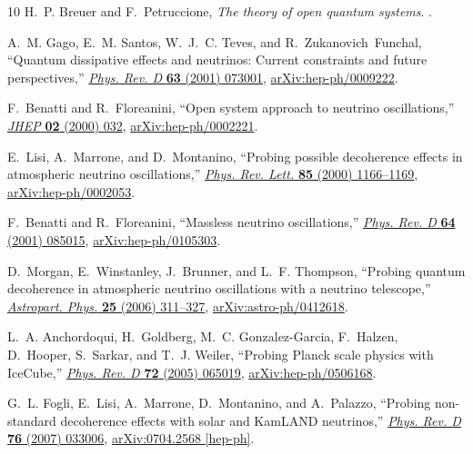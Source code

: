 \documentclass[aps, prd, onecolumn, tightenlines, notitlepage, superscriptaddress, nofootinbib, preprintnumbers, floatfix,showkeys,11pt]{revtex4-2}
\begin{document}
\begin{thebibliography}{10}
H.~P. Breuer and F.~Petruccione, {\em {The theory of open quantum systems}}.
.

A.~M. Gago, E.~M. Santos, W.~J.~C. Teves, and R.~Zukanovich~Funchal, ``{Quantum
  dissipative effects and neutrinos: Current constraints and future
  perspectives},'' \href{http://dx.doi.org/10.1103/PhysRevD.63.073001}{{\em
  Phys. Rev. D} {\bfseries 63} (2001) 073001},
  \href{http://arxiv.org/abs/hep-ph/0009222}{{\ttfamily arXiv:hep-ph/0009222}}.

F.~Benatti and R.~Floreanini, ``{Open system approach to neutrino
  oscillations},'' \href{http://dx.doi.org/10.1088/1126-6708/2000/02/032}{{\em
  JHEP} {\bfseries 02} (2000) 032},
  \href{http://arxiv.org/abs/hep-ph/0002221}{{\ttfamily arXiv:hep-ph/0002221}}.

E.~Lisi, A.~Marrone, and D.~Montanino, ``{Probing possible decoherence effects
  in atmospheric neutrino oscillations},''
  \href{http://dx.doi.org/10.1103/PhysRevLett.85.1166}{{\em Phys. Rev. Lett.}
  {\bfseries 85} (2000) 1166--1169},
  \href{http://arxiv.org/abs/hep-ph/0002053}{{\ttfamily arXiv:hep-ph/0002053}}.

F.~Benatti and R.~Floreanini, ``{Massless neutrino oscillations},''
  \href{http://dx.doi.org/10.1103/PhysRevD.64.085015}{{\em Phys. Rev. D}
  {\bfseries 64} (2001) 085015},
  \href{http://arxiv.org/abs/hep-ph/0105303}{{\ttfamily arXiv:hep-ph/0105303}}.

D.~Morgan, E.~Winstanley, J.~Brunner, and L.~F. Thompson, ``{Probing quantum
  decoherence in atmospheric neutrino oscillations with a neutrino
  telescope},''
  \href{http://dx.doi.org/10.1016/j.astropartphys.2006.03.001}{{\em Astropart.
  Phys.} {\bfseries 25} (2006) 311--327},
  \href{http://arxiv.org/abs/astro-ph/0412618}{{\ttfamily
  arXiv:astro-ph/0412618}}.

L.~A. Anchordoqui, H.~Goldberg, M.~C. Gonzalez-Garcia, F.~Halzen, D.~Hooper,
  S.~Sarkar, and T.~J. Weiler, ``{Probing Planck scale physics with IceCube},''
  \href{http://dx.doi.org/10.1103/PhysRevD.72.065019}{{\em Phys. Rev. D}
  {\bfseries 72} (2005) 065019},
  \href{http://arxiv.org/abs/hep-ph/0506168}{{\ttfamily arXiv:hep-ph/0506168}}.

G.~L. Fogli, E.~Lisi, A.~Marrone, D.~Montanino, and A.~Palazzo, ``{Probing
  non-standard decoherence effects with solar and KamLAND neutrinos},''
  \href{http://dx.doi.org/10.1103/PhysRevD.76.033006}{{\em Phys. Rev. D}
  {\bfseries 76} (2007) 033006},
  \href{http://arxiv.org/abs/0704.2568}{{\ttfamily arXiv:0704.2568 [hep-ph]}}.


\end{thebibliography}
\end{document}
